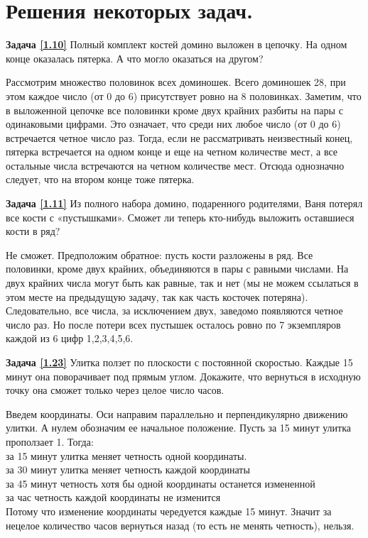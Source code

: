 \section{Решения некоторых задач.}

\textbf{Задача \ref{1.10}}
Полный комплект костей домино выложен в цепочку. На одном конце оказалась пятерка. А что могло оказаться на другом?


\begin{prf}
	Рассмотрим множество половинок всех доминошек. Всего доминошек 28, при этом каждое число (от 0 до 6) присутствует ровно на 8 половинках. Заметим, что в выложенной цепочке все половинки кроме двух крайних разбиты на пары с одинаковыми цифрами. Это означает, что среди них любое число (от 0 до 6) встречается четное число раз. Тогда, если не рассматривать неизвестный конец, пятерка встречается на одном конце и еще на четном количестве мест, а все остальные числа встречаются на четном количестве мест. Отсюда однозначно следует, что на втором конце тоже пятерка.
\end{prf}

\textbf{Задача \ref{1.11}}
Из полного набора домино, подаренного родителями, Ваня потерял все кости с «пустышками». Сможет ли теперь кто-нибудь выложить оставшиеся кости в ряд?

\begin{prf}
	Не сможет. Предположим обратное: пусть кости разложены в ряд. Все половинки, кроме двух крайних, объединяются в пары с равными числами. На двух крайних числа могут быть как равные, так и нет (мы не можем ссылаться в этом месте на предыдущую задачу, так как часть косточек потеряна). Следовательно, все числа, за исключением двух, заведомо появляются четное число раз. Но после потери всех пустышек осталось ровно по 7 экземпляров каждой из 6 цифр 1,2,3,4,5,6. 
\end{prf}



\textbf{Задача \ref{1.23}}
Улитка ползет по плоскости с постоянной скоростью. Каждые 15 минут она поворачивает под прямым углом. Докажите, что вернуться в исходную точку она сможет только через целое число часов.
\begin{prf}
	Введем координаты. Оси направим параллельно и перпендикулярно движению улитки. А нулем обозначим ее начальное положение. Пусть за 15 минут улитка проползает 1. Тогда: \\за 15 минут улитка меняет четность одной координаты.\\ за 30 минут улитка меняет четность каждой координаты\\ за 45 минут четность хотя бы одной координаты останется измененной\\ за час четность каждой координаты не изменится\\
	Потому что изменение координаты чередуется каждые 15 минут. Значит за нецелое количество часов вернуться назад (то есть не менять четность), нельзя.
\end{prf}

